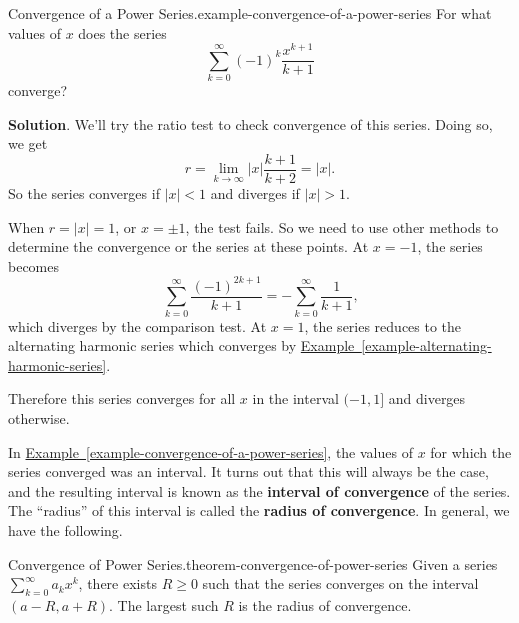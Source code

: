 \documentclass[10pt,]{book}
\newcommand{\terminology}[1]{\textbf{#1}}
\numberwithin{equation}{section}
\newcommand{\lt}{<}
\begin{document}
\begin{example}{Convergence of a Power Series.}{example-convergence-of-a-power-series}%
\hypertarget{p-934}{}%
For what values of \(x\) does the series%
\begin{equation*}
\sum_{k=0}^{\infty}(-1)^{k}\frac{x^{k+1}}{k+1}
\end{equation*}
converge?%
\par\smallskip%
\noindent\textbf{Solution}.\hypertarget{solution-190}{}\quad%
\hypertarget{p-935}{}%
We'll try the ratio test to check convergence of this series. Doing so, we get%
\begin{equation*}
r = \lim_{k\to\infty}|x|\frac{k+1}{k+2} = |x|\text{.}
\end{equation*}
So the series converges if \(|x| \lt 1\) and diverges if \(|x| > 1\).%
\par
\hypertarget{p-936}{}%
When \(r = |x| = 1\), or \(x = \pm1\), the test fails. So we need to use other methods to determine the convergence or the series at these points. At \(x = -1\), the series becomes%
\begin{equation*}
\sum_{k=0}^{\infty}\frac{(-1)^{2k+1}}{k+1} = - \sum_{k=0}^{\infty}\frac{1}{k+1}\text{,}
\end{equation*}
which diverges by the comparison test. At \(x = 1\), the series reduces to the alternating harmonic series which converges by \hyperref[example-alternating-harmonic-series]{Example~\ref{example-alternating-harmonic-series}}.%
\par
\hypertarget{p-937}{}%
Therefore this series converges for all \(x\) in the interval \((-1, 1]\) and diverges otherwise.%
\end{example}
\hypertarget{p-938}{}%
In \hyperref[example-convergence-of-a-power-series]{Example~\ref{example-convergence-of-a-power-series}}, the values of \(x\) for which the series converged was an interval. It turns out that this will always be the case, and the resulting interval is known as the \terminology{interval of convergence} of the series. The ``radius'' of this interval is called the \terminology{radius of convergence}. In general, we have the following.%
\begin{theorem}{Convergence of Power Series.}{}{theorem-convergence-of-power-series}%
\hypertarget{p-939}{}%
Given a series \(\sum_{k=0}^{\infty}a_{k}x^{k}\), there exists \(R \geq 0\) such that the series converges on the interval \((a - R, a + R)\). The largest such \(R\) is the radius of convergence.%
\end{theorem}
\hypertarget{p-940}{}%
\end{document}
